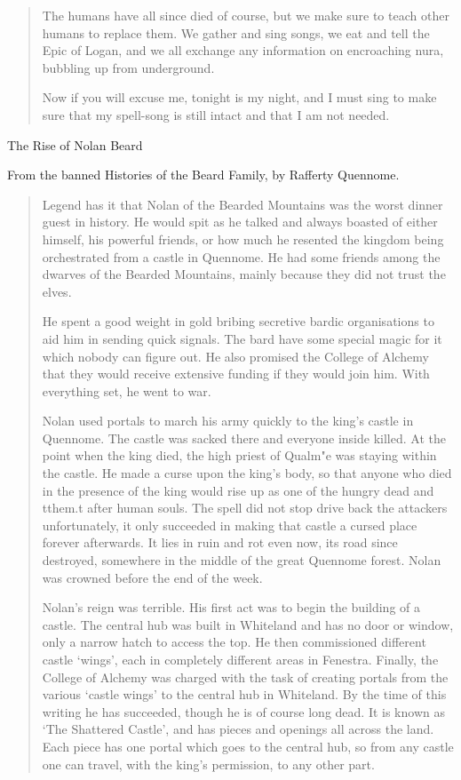 \begin{quotation}
	The humans have all since died of course, but we make sure to teach other humans to replace them.  We gather and sing songs, we eat and tell the Epic of Logan, and we all exchange any information on encroaching nura, bubbling up from underground.

	Now if you will excuse me, tonight is my night, and I must sing to make sure that my spell-song is still intact and that I am not needed.

\end{quotation}

The Rise of Nolan Beard

From the banned Histories of the Beard Family, by Rafferty Quennome.

\begin{quotation}

	Legend has it that Nolan of the Bearded Mountains was the worst dinner guest in history.  He would spit as he talked and always boasted of either himself, his powerful friends, or how much he resented the kingdom being orchestrated from a castle in Quennome.  He had some friends among the dwarves of the Bearded Mountains, mainly because they did not trust the elves.

	He spent a good weight in gold bribing secretive bardic organisations to aid him in sending quick signals.  The bard have some special magic for it which nobody can figure out.  He also promised the College of Alchemy that they would receive extensive funding if they would join him.  With everything set, he went to war.

	Nolan used portals to march his army quickly to the king's castle in Quennome.  The castle was sacked there and everyone inside killed.  At the point when the king died, the high priest of Qualm"{e} was staying within the castle.  He made a curse upon the king's body, so that anyone who died in the presence of the king would rise up as one of the hungry dead and tthem.t after human souls.  The spell did not stop drive back the attackers unfortunately, it only succeeded in making that castle a cursed place forever afterwards.  It lies in ruin and rot even now, its road since destroyed, somewhere in the middle of the great Quennome forest.  Nolan was crowned before the end of the week.

	Nolan's reign was terrible.  His first act was to begin the building of a castle.  The central hub was built in Whiteland and has no door or window, only a narrow hatch to access the top.  He then commissioned different castle `wings', each in completely different areas in Fenestra.  Finally, the College of Alchemy was charged with the task of creating portals from the various `castle wings' to the central hub in Whiteland.  By the time of this writing he has succeeded, though he is of course long dead.  It is known as `The Shattered Castle', and has pieces and openings all across the land.  Each piece has one portal which goes to the central hub, so from any castle one can travel, with the king's permission, to any other part.


\end{quotation}
